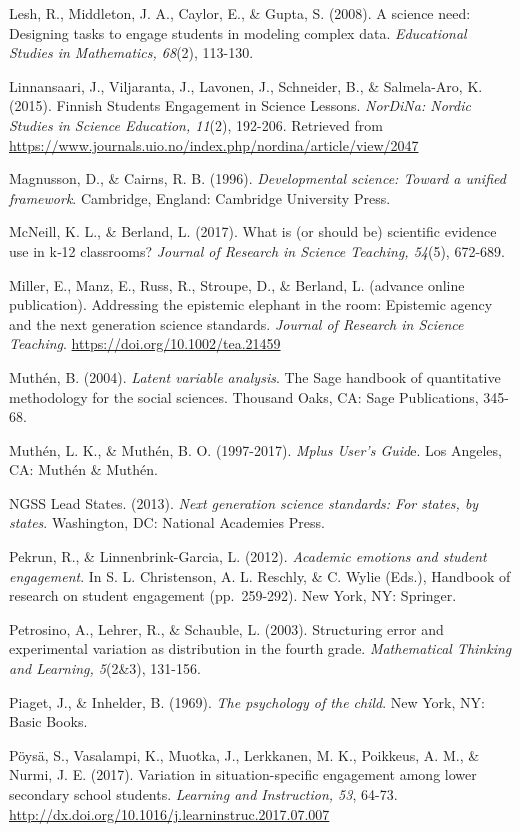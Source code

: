 \documentclass[]{msu-thesis}
\theoremstyle{definition}
\theoremstyle{definition}
\theoremstyle{definition}
\theoremstyle{remark}
\begin{document}
Lesh, R., Middleton, J. A., Caylor, E., \& Gupta, S. (2008). A science
need: Designing tasks to engage students in modeling complex data.
\emph{Educational Studies in Mathematics, 68}(2), 113-130.

Linnansaari, J., Viljaranta, J., Lavonen, J., Schneider, B., \&
Salmela-Aro, K. (2015). Finnish Students Engagement in Science Lessons.
\emph{NorDiNa: Nordic Studies in Science Education, 11}(2), 192-206.
Retrieved from
\url{https://www.journals.uio.no/index.php/nordina/article/view/2047}

Magnusson, D., \& Cairns, R. B. (1996). \emph{Developmental science:
Toward a unified framework}. Cambridge, England: Cambridge University
Press.

McNeill, K. L., \& Berland, L. (2017). What is (or should be) scientific
evidence use in k‐12 classrooms? \emph{Journal of Research in Science
Teaching, 54}(5), 672-689.

Miller, E., Manz, E., Russ, R., Stroupe, D., \& Berland, L. (advance
online publication). Addressing the epistemic elephant in the room:
Epistemic agency and the next generation science standards.
\emph{Journal of Research in Science Teaching}.
\url{https://doi.org/10.1002/tea.21459}

Muthén, B. (2004). \emph{Latent variable analysis}. The Sage handbook of
quantitative methodology for the social sciences. Thousand Oaks, CA:
Sage Publications, 345-68.

Muthén, L. K., \& Muthén, B. O. (1997-2017). \emph{Mplus User's Guid}e.
Los Angeles, CA: Muthén \& Muthén.

NGSS Lead States. (2013). \emph{Next generation science standards: For
states, by states}. Washington, DC: National Academies Press.

Pekrun, R., \& Linnenbrink-Garcia, L. (2012). \emph{Academic emotions
and student engagement}. In S. L. Christenson, A. L. Reschly, \& C.
Wylie (Eds.), Handbook of research on student engagement (pp.~259-292).
New York, NY: Springer.

Petrosino, A., Lehrer, R., \& Schauble, L. (2003). Structuring error and
experimental variation as distribution in the fourth grade.
\emph{Mathematical Thinking and Learning, 5}(2\&3), 131-156.

Piaget, J., \& Inhelder, B. (1969). \emph{The psychology of the child}.
New York, NY: Basic Books.

Pöysä, S., Vasalampi, K., Muotka, J., Lerkkanen, M. K., Poikkeus, A. M.,
\& Nurmi, J. E. (2017). Variation in situation-specific engagement among
lower secondary school students. \emph{Learning and Instruction, 53},
64-73. \url{http://dx.doi.org/10.1016/j.learninstruc.2017.07.007}
\end{document}

